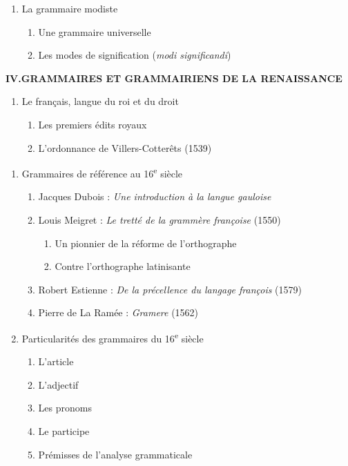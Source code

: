\begin{keybox}
\begin{enumerate}[label=\arabic*.]
\item La grammaire modiste
\begin{enumerate}[label=\textcircled{\scriptsize\arabic*}]
\item Une grammaire universelle
\item Les modes de signification (\textit{modi significandi})
\end{enumerate}
\end{enumerate}
\textbf{IV.\quad GRAMMAIRES ET GRAMMAIRIENS DE LA RENAISSANCE}
\begin{enumerate}[label=\arabic*.]
\item Le français, langue du roi et du droit
\begin{enumerate}[label=\textcircled{\scriptsize\arabic*}]
\item Les premiers édits royaux
\item L’ordonnance de Villers-Cotterêts (1539)
\end{enumerate}
\end{enumerate}
\begin{enumerate}[label=\arabic*.,start=2]
\item Grammaires de référence au 16\textsuperscript{e} siècle
\begin{enumerate}[label=\textcircled{\scriptsize\arabic*}]
\item Jacques Dubois : \textit{Une introduction à la langue gauloise}
\item Louis Meigret : \textit{Le tretté de la grammère françoise} (1550)
\begin{enumerate}[label=\arabic*.]
\item Un pionnier de la réforme de l’orthographe
\item Contre l’orthographe latinisante
\end{enumerate}
\item Robert Estienne : \textit{De la précellence du langage françois} (1579)
\item Pierre de La Ramée : \textit{Gramere} (1562)
\end{enumerate}
\item Particularités des grammaires du 16\textsuperscript{e} siècle
\begin{enumerate}[label=\textcircled{\scriptsize\arabic*}]
\item L’article
\item L’adjectif
\item Les pronoms
\item Le participe
\item Prémisses de l’analyse grammaticale

\end{enumerate}
\end{enumerate}
\end{keybox}
